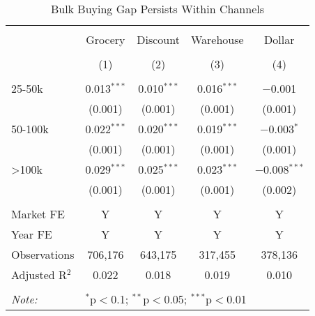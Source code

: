 
\begin{table}[!htbp] \centering 
  \caption{Bulk Buying Gap Persists Within Channels} 
  \label{tab:discountingWithinChannel} 
\begin{tabular}{@{\extracolsep{5pt}}lcccc} 
\\[-1.8ex]\hline 
\hline \\[-1.8ex] 
 & Grocery & Discount & Warehouse & Dollar \\ 
\\[-1.8ex] & (1) & (2) & (3) & (4)\\ 
\hline \\[-1.8ex] 
 25-50k & 0.013$^{***}$ & 0.010$^{***}$ & 0.016$^{***}$ & $-$0.001 \\ 
  & (0.001) & (0.001) & (0.001) & (0.001) \\ 
  50-100k & 0.022$^{***}$ & 0.020$^{***}$ & 0.019$^{***}$ & $-$0.003$^{*}$ \\ 
  & (0.001) & (0.001) & (0.001) & (0.001) \\ 
  >100k & 0.029$^{***}$ & 0.025$^{***}$ & 0.023$^{***}$ & $-$0.008$^{***}$ \\ 
  & (0.001) & (0.001) & (0.001) & (0.002) \\ 
 \hline \\[-1.8ex] 
Market FE & Y & Y & Y & Y \\ 
Year FE & Y & Y & Y & Y \\ 
Observations & 706,176 & 643,175 & 317,455 & 378,136 \\ 
Adjusted R$^{2}$ & 0.022 & 0.018 & 0.019 & 0.010 \\ 
\hline 
\hline \\[-1.8ex] 
\textit{Note:}  & \multicolumn{4}{l}{$^{*}$p$<$0.1; $^{**}$p$<$0.05; $^{***}$p$<$0.01} \\ 
\end{tabular} 
\end{table} 
